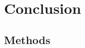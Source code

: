 \documentclass[12pt,english]{article}
\begin{document}
\begin{bibunit}
\section{Conclusion} %




  \begin{small} %
\section*{\normalsize Methods}\label{sec:methods} %



\end{small}
\end{bibunit}
\end{document}

